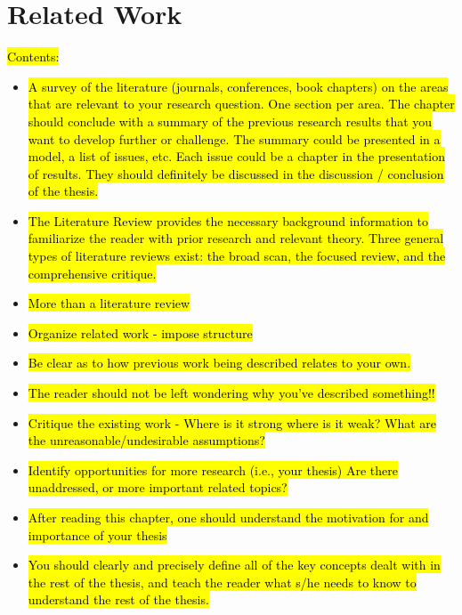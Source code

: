 \newpage
\section{Related Work}

\hl{Contents:}
\begin{itemize}
\item \hl{A survey of the literature (journals, conferences, book chapters) on the areas that are relevant to your research question. One section per area.
The chapter should conclude with a summary of the previous research results that you want to develop further or challenge. The summary could be presented in a model, a list of issues, etc. Each issue could be a chapter in the presentation of results. They should definitely be discussed in the discussion / conclusion of the thesis.}
\item \hl{The Literature Review provides the necessary background information to familiarize the reader with prior research and relevant theory.  Three general types of literature reviews exist:  the broad scan, the focused review, and the comprehensive critique.}
\end{itemize}

\begin{itemize}
\item \hl{More than a literature review}
\item \hl{Organize related work - impose structure}
\item \hl{Be clear as to how previous work being described relates to your own.}
\item \hl{The reader should not be left wondering why you've described something!!}
\item \hl{Critique the existing work - Where is it strong where is it weak? What are the unreasonable/undesirable assumptions?}
\item \hl{Identify opportunities for more research (i.e., your thesis) Are there unaddressed, or more important related topics?}
\item \hl{After reading this chapter, one should understand the motivation for and importance of your thesis}
\item \hl{You should clearly and precisely define all of the key concepts dealt with in the rest of the thesis, and teach the reader what s/he needs to know to understand the rest of the thesis.}
 
\end{itemize}


